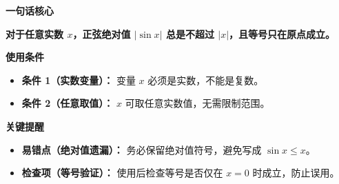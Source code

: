 \begin{summarybox}
\textbf{\textcolor{CSummary}{一句话核心}}

\textbf{对于任意实数 $x$，正弦绝对值 $|\sin x|$ 总是不超过 $|x|$，且等号只在原点成立。}

\medskip
\textbf{\textcolor{CSummary}{使用条件}}
\begin{itemize}[leftmargin=*, itemsep=0.5em, topsep=0.4em]
    \item \textbf{条件 1（实数变量）：} 变量 $x$ 必须是实数，不能是复数。
    \item \textbf{条件 2（任意取值）：} $x$ 可取任意实数值，无需限制范围。
\end{itemize}

\medskip
\textbf{\textcolor{CSummary}{关键提醒}}
\begin{itemize}[leftmargin=*, itemsep=0.5em, topsep=0.4em]
    \item \textbf{易错点（绝对值遗漏）：} 务必保留绝对值符号，避免写成 $\sin x \le x$。
    \item \textbf{检查项（等号验证）：} 使用后检查等号是否仅在 $x=0$ 时成立，防止误用。
\end{itemize}
\end{summarybox}
